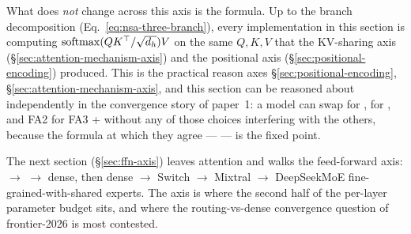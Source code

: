 What does \emph{not} change across this axis is the formula. Up to the
 branch decomposition (Eq.~\eqref{eq:nsa-three-branch}), every
implementation in this section is computing
$\operatorname{softmax}(QK^\top/\sqrt{d_h})V$ on the same $Q, K, V$ that the
KV-sharing axis (\S\ref{sec:attention-mechanism-axis}) and the
positional axis (\S\ref{sec:positional-encoding}) produced. This is the
practical reason axes \S\ref{sec:positional-encoding},
\S\ref{sec:attention-mechanism-axis}, and this section can be reasoned
about independently in the convergence story of paper~1: a model can
swap  for ,  for , and FA2 for FA3 +  without any of
those choices interfering with the others, because the formula at
which they agree ---  --- is the fixed point.

The next section (\S\ref{sec:ffn-axis}) leaves attention and walks the
feed-forward axis:  $\to$  $\to$  dense, then dense
$\to$ Switch $\to$ Mixtral $\to$ DeepSeekMoE fine-grained-with-shared
experts. The  axis is where the second half of the per-layer
parameter budget sits, and where the routing-vs-dense convergence
question of frontier-2026 is most contested.
